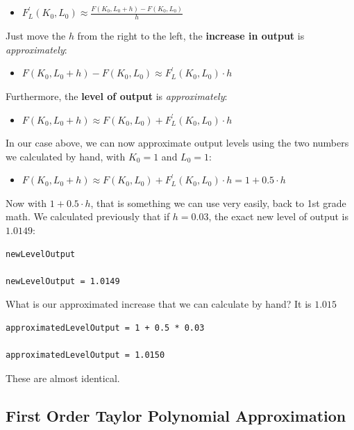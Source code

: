 \documentclass[
]{book}
\providecommand{\tightlist}{%
  \setlength{\itemsep}{0pt}\setlength{\parskip}{0pt}}
\begin{document}
\begin{itemize}
\tightlist
\item
  \(\displaystyle F_L^{\prime } (K_0 ,L_0 )\approx \frac{F(K_0 ,L_0 +h)-F(K_0 ,L_0 )}{h}\)
\end{itemize}

Just move the \(h\) from the right to the left, the \textbf{increase in output}
is \emph{approximately}:

\begin{itemize}
\tightlist
\item
  \(\displaystyle F(K_0 ,L_0 +h)-F(K_0 ,L_0 )\approx F_L^{\prime } (K_0 ,L_0 )\cdot h\)
\end{itemize}

Furthermore, the \textbf{level of output} is \emph{approximately}:

\begin{itemize}
\tightlist
\item
  \(\displaystyle F(K_0 ,L_0 +h)\approx F(K_0 ,L_0 )+F_L^{\prime } (K_0 ,L_0 )\cdot h\)
\end{itemize}

In our case above, we can now approximate output levels using the two
numbers we calculated by hand, with \(K_0 =1\) and \(L_0 =1\):

\begin{itemize}
\tightlist
\item
  \(\displaystyle F(K_0 ,L_0 +h)\approx F(K_0 ,L_0 )+F_L^{\prime } (K_0 ,L_0 )\cdot h=1+0.5\cdot h\)
\end{itemize}

Now with \({1+0.5\cdot h}\), that is something we can use very easily,
back to 1st grade math. We calculated previously that if \(h=0.03\), the
exact new level of output is \(1.0149\):

\begin{verbatim}
newLevelOutput

newLevelOutput = 1.0149
\end{verbatim}

What is our approximated increase that we can calculate by hand? It is
\(1.015\)

\begin{verbatim}
approximatedLevelOutput = 1 + 0.5 * 0.03

approximatedLevelOutput = 1.0150
\end{verbatim}

These are almost identical.

\hypertarget{first-order-taylor-polynomial-approximation}{%
\subsection{First Order Taylor Polynomial Approximation}\label{first-order-taylor-polynomial-approximation}}
\end{document}
